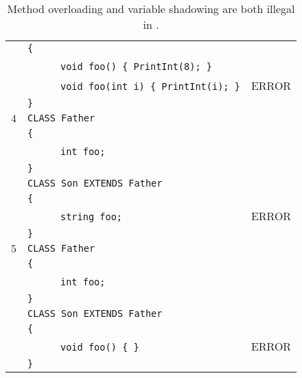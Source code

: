 \documentclass{article}
\begin{document}
\begin{table}[h]
\begin{tabular}{|l|l|l|}
     & \verb"{"                                       &       \\
     & ~ ~ ~ ~\verb"void foo() { PrintInt(8); }"      &       \\
     & ~ ~ ~ ~\verb"void foo(int i) { PrintInt(i); }" & ERROR \\
     & \verb"}"                                       &       \\
\hline
 $4$ & \verb"CLASS Father"             &       \\
     & \verb"{"                        &       \\
     & ~ ~ ~ ~\verb"int foo;"          &       \\
     & \verb"}"                        &       \\
     & \verb"CLASS Son EXTENDS Father" &       \\
     & \verb"{"                        &       \\
     & ~ ~ ~ ~\verb"string foo;"       & ERROR \\
     & \verb"}"                        &       \\
\hline
 $5$ & \verb"CLASS Father"             &       \\
     & \verb"{"                        &       \\
     & ~ ~ ~ ~\verb"int foo;"          &       \\
     & \verb"}"                        &       \\
     & \verb"CLASS Son EXTENDS Father" &       \\
     & \verb"{"                        &       \\
     & ~ ~ ~ ~\verb"void foo() { }"       & ERROR \\
     & \verb"}"                        &       \\
\hline
\end{tabular}
\caption{Method overloading and variable shadowing are both illegal in \plname.
\label{Table_Code_Examples_Overload_Override}}
\end{table}
\newpage
\end{document}
